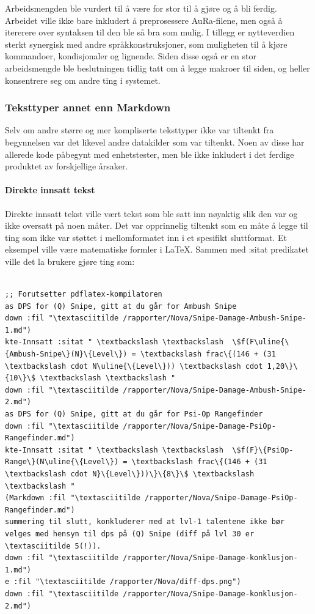 \documentclass[norsk, 11pt, a4paper]{article}
\begin{document}
Arbeidsmengden ble vurdert til å være for stor til å gjøre og å bli ferdig. Arbeidet ville ikke bare inkludert å preprosessere AuRa-filene, men også å itererere over syntaksen til den ble så bra som mulig.
I tillegg er nytteverdien sterkt synergisk med andre språkkonstruksjoner, som muligheten til å kjøre kommandoer, kondisjonaler og lignende. Siden disse også er en stor arbeidsmengde ble beslutningen tidlig tatt om å legge makroer til siden, og heller konsentrere seg om andre ting i systemet.



\subsubsection{Teksttyper annet enn Markdown}



Selv om andre større og mer kompliserte teksttyper ikke var tiltenkt fra begynnelsen var det likevel andre datakilder som var tiltenkt.
Noen av disse har allerede kode påbegynt med enhetstester, men ble ikke inkludert i det ferdige produktet av forskjellige årsaker.



\paragraph{Direkte innsatt tekst}
Direkte innsatt tekst ville vært tekst som ble satt inn nøyaktig slik den var og ikke oversatt på noen måter. Det var opprinnelig tiltenkt som en måte å legge til ting som ikke var støttet i mellomformatet inn i et spesifikt sluttformat. Et eksempel ville være matematiske formler i LaTeX.
Sammen med :sitat predikatet ville det la brukere gjøre ting som:




\begin{lstlisting}

;; Forutsetter pdflatex-kompilatoren
as DPS for (Q) Snipe, gitt at du går for Ambush Snipe
down :fil "\textasciitilde /rapporter/Nova/Snipe-Damage-Ambush-Snipe-1.md")
kte-Innsatt :sitat " \textbackslash \textbackslash  \$f(F\uline{\{Ambush-Snipe\}(N}\{Level\}) = \textbackslash frac\{(146 + (31 \textbackslash cdot N\uline{\{Level\})) \textbackslash cdot 1,20\}\{10\}\$ \textbackslash \textbackslash "
down :fil "\textasciitilde /rapporter/Nova/Snipe-Damage-Ambush-Snipe-2.md")
as DPS for (Q) Snipe, gitt at du går for Psi-Op Rangefinder
down :fil "\textasciitilde /rapporter/Nova/Snipe-Damage-PsiOp-Rangefinder.md")
kte-Innsatt :sitat " \textbackslash \textbackslash  \$f(F}\{PsiOp-Range\}(N\uline{\{Level\}) = \textbackslash frac\{(146 + (31 \textbackslash cdot N}\{Level\}))\}\{8\}\$ \textbackslash \textbackslash "
(Markdown :fil "\textasciitilde /rapporter/Nova/Snipe-Damage-PsiOp-Rangefinder.md")
summering til slutt, konkluderer med at lvl-1 talentene ikke bør velges med hensyn til dps på (Q) Snipe (diff på lvl 30 er \textasciitilde 5(!)).
down :fil "\textasciitilde /rapporter/Nova/Snipe-Damage-konklusjon-1.md")
e :fil "\textasciitilde /rapporter/Nova/diff-dps.png")
down :fil "\textasciitilde /rapporter/Nova/Snipe-Damage-konklusjon-2.md")
\end{lstlisting}
\end{document}
